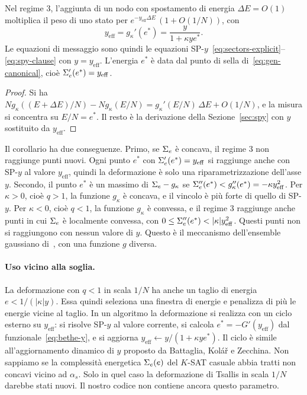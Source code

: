 \begin{corollario}
\label{cor:yeff}
Nel regime 3, l'aggiunta di un nodo con spostamento di energia $\Delta E=O(1)$ moltiplica il peso di uno stato per $e^{-y_{\mathrm{eff}}\Delta E}\,(1+O(1/N))$, con
\begin{equation}
y_{\mathrm{eff}}=g_\kappa'(e^*)=\frac{y}{1+\kappa y e^*}.
\label{eq:yeff}
\end{equation}
Le equazioni di messaggio sono quindi le equazioni SP-$y$~\eqref{eq:sectors-explicit}--\eqref{eq:spy-clause} con $y=y_{\mathrm{eff}}$.
L'energia $e^*$ è data dal punto di sella di~\eqref{eq:gen-canonical}, cioè $\Sigma_e'(e^*)=y_{\mathrm{eff}}$.
\end{corollario}

\begin{proof}
Si ha $Ng_\kappa((E+\Delta E)/N)-Ng_\kappa(E/N)=g_\kappa'(E/N)\,\Delta E+O(1/N)$, e la misura si concentra su $E/N=e^*$.
Il resto è la derivazione della Sezione~\ref{sec:spy} con $y$ sostituito da $y_{\mathrm{eff}}$.
\end{proof}

Il corollario ha due conseguenze.
Primo, se $\Sigma_e$ è concava, il regime 3 non raggiunge punti nuovi.
Ogni punto $e^*$ con $\Sigma_e'(e^*)=y_{\mathrm{eff}}$ si raggiunge anche con SP-$y$ al valore $y_{\mathrm{eff}}$, quindi la deformazione è solo una riparametrizzazione dell'asse $y$.
Secondo, il punto $e^*$ è un massimo di $\Sigma_e-g_\kappa$ se $\Sigma_e''(e^*)<g_\kappa''(e^*)=-\kappa y_{\mathrm{eff}}^2$.
Per $\kappa>0$, cioè $q>1$, la funzione $g_\kappa$ è concava, e il vincolo è più forte di quello di SP-$y$.
Per $\kappa<0$, cioè $q<1$, la funzione $g_\kappa$ è convessa, e il regime 3 raggiunge anche punti in cui $\Sigma_e$ è localmente convessa, con $0\le\Sig_e''(e^*)<|\kappa|y_{\mathrm{eff}}^2$.
Questi punti non si raggiungono con nessun valore di $y$.
Questo è il meccanismo dell'ensemble gaussiano di~\citep{costeniuc2006generalized}, con una funzione $g$ diversa.

\paragraph{Uso vicino alla soglia.}
La deformazione con $q<1$ in scala $1/N$ ha anche un taglio di energia $e<1/(|\kappa|y)$.
Essa quindi seleziona una finestra di energie e penalizza di più le energie vicine al taglio.
In un algoritmo la deformazione si realizza con un ciclo esterno su $y_{\mathrm{eff}}$: si risolve SP-$y$ al valore corrente, si calcola $e^*=-G'(y_{\mathrm{eff}})$ dal funzionale~\eqref{eq:bethe-y}, e si aggiorna $y_{\mathrm{eff}}\leftarrow y/(1+\kappa ye^*)$.
Il ciclo è simile all'aggiornamento dinamico di $y$ proposto da Battaglia, Kolář e Zecchina.
Non sappiamo se la complessità energetica $\Sigma_e(e)$ del $K$-SAT casuale abbia tratti non concavi vicino ad $\alpha_s$.
Solo in quel caso la deformazione di Tsallis in scala $1/N$ darebbe stati nuovi.
Il nostro codice non contiene ancora questo parametro.


